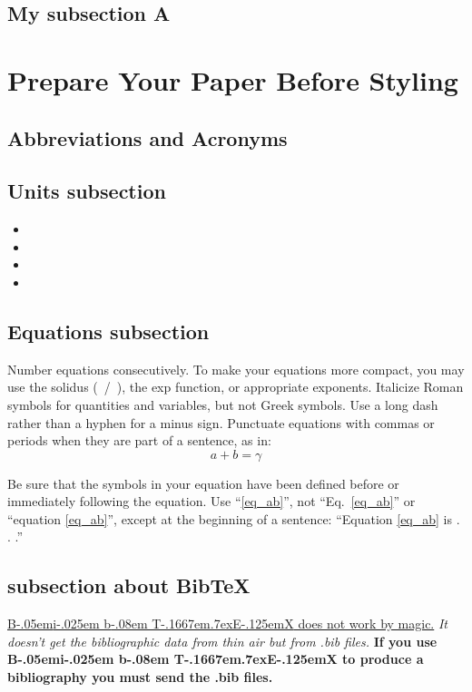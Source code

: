 \documentclass[conference]{IEEEtran}
\def\BibTeX{{\rm B\kern-.05em{\sc i\kern-.025em b}\kern-.08em
    T\kern-.1667em\lower.7ex\hbox{E}\kern-.125emX}}
\begin{document}
\subsection{My subsection A}
\lipsum[1]

\section{Prepare Your Paper Before Styling}
\lipsum[1-2]

\subsection{Abbreviations and Acronyms}\label{AA}
\lipsum[1]

\subsection{Units subsection}
\begin{itemize}
    \item \lipsum[1]
    \item \lipsum[1]
    \item \lipsum[1]
    \item \lipsum[1]
\end{itemize}

\subsection{Equations subsection}
Number equations consecutively. To make your
equations more compact, you may use the solidus (~/~), the exp function, or
appropriate exponents. Italicize Roman symbols for quantities and variables,
but not Greek symbols. Use a long dash rather than a hyphen for a minus
sign. Punctuate equations with commas or periods when they are part of a
sentence, as in:
\begin{equation}
    a+b=\gamma\label{eq_ab}
\end{equation}

Be sure that the
symbols in your equation have been defined before or immediately following
the equation. Use ``\eqref{eq_ab}'', not ``Eq.~\eqref{eq_ab}'' or ``equation \eqref{eq_ab}'', except at
the beginning of a sentence: ``Equation \eqref{eq_ab} is . . .''

\subsection{subsection about BibTeX}
\underline{{\BibTeX} does not work by magic.} \textit{It doesn't get the bibliographic
data from thin air but from .bib files.} \textbf{If you use {\BibTeX} to produce a
bibliography you must send the .bib files.}
\end{document}
